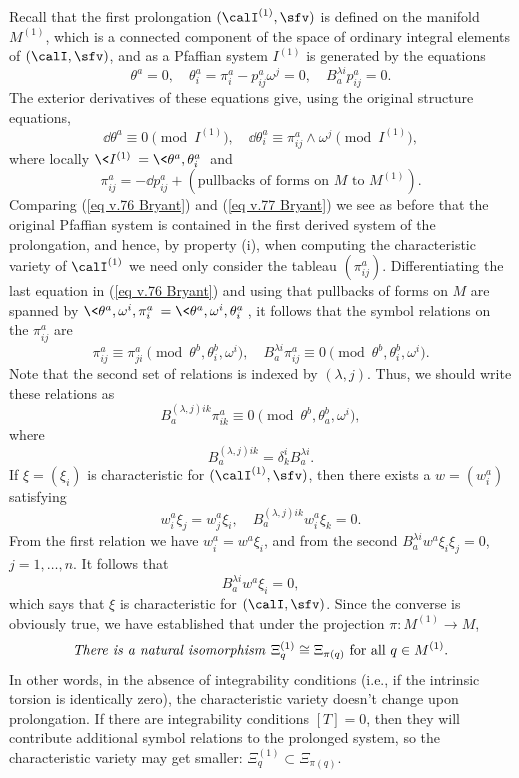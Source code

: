 Recall that the first prolongation $(\calI^{(1)},\sfv)$ is defined on the manifold $M^{(1)}$, which is a connected component of the space of ordinary integral elements of $(\calI,\sfv)$, and as a Pfaffian system $I^{(1)}$ is generated by the equations 
\[\theta^a=0,\quad \theta^a_i=\pi^a_i-p^a_{ij}\omega^j=0,\quad B^{\lambda i}_ap^a_{ij}=0.\label{eq v.76 Bryant}\]
The exterior derivatives of these equations give, using the original structure equations, 
\[\dd\theta^a\equiv 0\pmod{I^{(1)}},\quad\dd\theta^a_i\equiv \pi^a_{ij}\wedge\omega^j\pmod{I^{(1)}},\label{eq v.77 Bryant}\]
where locally $\<I^{(1)}\>=\<\theta^a,\theta^a_i\>$ and 
\[\pi^a_{ij}=-\dd p^a_{ij}+(\text{pullbacks of forms on $M$ to }M^{(1)}).\]
Comparing (\ref{eq v.76 Bryant}) and (\ref{eq v.77 Bryant}) we see as before that the original Pfaffian system is contained in the first derived system of the prolongation, and hence, by  property (i), when computing the characteristic variety of $\calI^{(1)}$ we need only consider the tableau $\left(\pi^a_{ij}\right)$. Differentiating the last equation in (\ref{eq v.76 Bryant}) and using that pullbacks of forms on $M$ are spanned by $\<\theta^a,\omega^i,\pi^a_i\>=\<\theta^a,\omega^i,\theta^a_i\>$, it follows that the symbol relations on the $\pi^a_{ij}$ are 
\[\pi^a_{ij}\equiv \pi^a_{ji}\pmod{\theta^b,\theta^b_i,\omega^i},\quad B^{\lambda i}_a\pi^a_{ij}\equiv 0\pmod{\theta^b,\theta^b_i,\omega^i}.\]
Note that the second set of relations is indexed by $(\lambda,j)$. Thus, we should write these relations as 
\[B^{(\lambda,j)ik}_a \pi^a_{ik}\equiv 0 \pmod{\theta^b,\theta^b_a,\omega^i},\]
where 
\[B^{(\lambda,j)ik}_a=\delta^i_k B^{\lambda i}_a.\]
If $\xi=(\xi_i)$ is characteristic for $(\calI^{(1)},\sfv)$, then there exists a $w=(w^a_i)$ satisfying 
\[w^a_i\xi_j=w^a_j\xi_i,\quad B^{(\lambda,j)ik}_aw^a_i\xi_k=0.\]
From the first relation we have $w^a_i=w^a\xi_i$, and from the second $B^{\lambda i}_aw^a\xi_i\xi_j=0$, $j=1,\ldots,n$. It follows that 
\[B^{\lambda i}_aw^a\xi_i=0,\]
which says that $\xi$ is characteristic for $(\calI,\sfv)$. Since the converse is obviously true, we have established that under the projection $\pi:M^{(1)}\to M$,
\[\text{\emph{There is a natural isomorphism }} \Xi^{(1)}_q\cong \Xi_{\pi(q)}\text{ for all } q\in M^{(1)}.\]
In other words, in the absence of integrability conditions (i.e., if the intrinsic torsion is identically zero), the characteristic variety doesn't change upon prolongation. If there are integrability conditions $[T]=0$, then they will contribute additional symbol relations to the prolonged system, so the characteristic variety may get smaller: $\Xi^{(1)}_q\subset \Xi_{\pi(q)}$.


